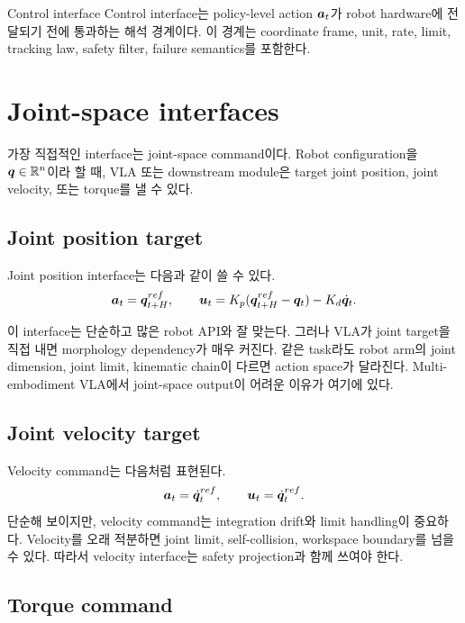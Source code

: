 \begin{definitionbox}{Control interface}
Control interface는 policy-level action $\bm{a}_t$가 robot hardware에 전달되기 전에 통과하는 해석 경계이다. 이 경계는 coordinate frame, unit, rate, limit, tracking law, safety filter, failure semantics를 포함한다.
\end{definitionbox}

\section{Joint-space interfaces}

가장 직접적인 interface는 joint-space command이다. Robot configuration을 $\bm{q}\in\mathbb{R}^n$이라 할 때, VLA 또는 downstream module은 target joint position, joint velocity, 또는 torque를 낼 수 있다.

\subsection{Joint position target}

Joint position interface는 다음과 같이 쓸 수 있다.
\begin{equation}
  \bm{a}_t = \bm{q}^{ref}_{t+H},
  \qquad
  \bm{u}_t = K_p(\bm{q}^{ref}_{t+H}-\bm{q}_t)-K_d\dot{\bm{q}}_t.
  \label{eq:joint-position-control}
\end{equation}

이 interface는 단순하고 많은 robot API와 잘 맞는다. 그러나 VLA가 joint target을 직접 내면 morphology dependency가 매우 커진다. 같은 task라도 robot arm의 joint dimension, joint limit, kinematic chain이 다르면 action space가 달라진다. Multi-embodiment VLA에서 joint-space output이 어려운 이유가 여기에 있다.

\subsection{Joint velocity target}

Velocity command는 다음처럼 표현된다.
\begin{equation}
  \bm{a}_t = \dot{\bm{q}}^{ref}_t,
  \qquad
  \bm{u}_t = \dot{\bm{q}}^{ref}_t.
  \label{eq:joint-velocity-control}
\end{equation}
단순해 보이지만, velocity command는 integration drift와 limit handling이 중요하다. Velocity를 오래 적분하면 joint limit, self-collision, workspace boundary를 넘을 수 있다. 따라서 velocity interface는 safety projection과 함께 쓰여야 한다.

\subsection{Torque command}

